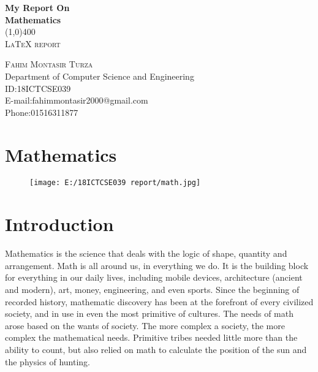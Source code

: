 \documentclass{article}
\begin{document}
\begin{titlepage}
\begin{center}
\huge{\bfseries My Report On}\\
\huge{\bfseries Mathematics}\\
\line(1,0){400}\\
\textsc{\LARGE LaTeX report}\\
\end{center}

\begin{flushright}
\textsc{\LARGE Fahim Montasir Turza\\}
Department of Computer Science and Engineering\\
ID:18ICTCSE039\\
E-mail:fahimmontasir2000@gmail.com\\
Phone:01516311877\\
\end{flushright}

\end{titlepage}

\tableofcontents
\thispagestyle{empty}
\cleardoublepage


\setcounter{page}{1}
\section{Mathematics}
\begin{figure}[H]
\texttt{[image: E:/18ICTCSE039 report/math.jpg]}
\end{figure}

\section{Introduction}
Mathematics is the science that deals with the logic of shape, quantity and arrangement. Math is all around us, in everything we do. It is the building block for everything in our daily lives, including mobile devices, architecture (ancient and modern), art, money, engineering, and even sports.\newline \newline
Since the beginning of recorded history, mathematic discovery has been at the forefront of every civilized society, and in use in even the most primitive of cultures. The needs of math arose based on the wants of society. The more complex a society, the more complex the mathematical needs. Primitive tribes needed little more than the ability to count, but also relied on math to calculate the position of the sun and the physics of hunting.
\end{document}
